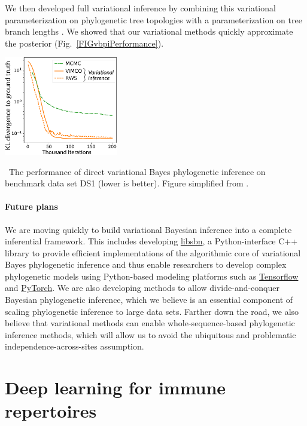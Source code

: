 \documentclass[nobib]{tufte-handout}
\begin{document}
We then developed full variational inference by combining this variational parameterization on phylogenetic tree topologies with a parameterization on tree branch lengths \cite{Zhang2018-lw}.
We showed that our variational methods quickly approximate the posterior (Fig.~\ref{FIGvbpiPerformance}).

\begin{marginfigure}[0.7in]%
  \includegraphics[width=1.95in]{vbpi-performance}
  \caption{\
    The performance of direct variational Bayes phylogenetic inference on benchmark data set DS1 (lower is better).
    Figure simplified from \cite{Zhang2018-lw}.
    }
  \label{FIGvbpiPerformance}
\end{marginfigure}%

\paragraph{Future plans}
We are moving quickly to build variational Bayesian inference into a complete inferential framework.
This includes developing \href{https://github.com/matsengrp/libsbn/}{libsbn}, a Python-interface C++ library to provide efficient implementations of the algorithmic core of variational Bayes phylogenetic inference and thus enable researchers to develop complex phylogenetic models using Python-based modeling platforms such as \href{https://www.tensorflow.org/}{Tensorflow} and \href{https://pytorch.org/}{PyTorch}.
We are also developing methods to allow divide-and-conquer Bayesian phylogenetic inference, which we believe is an essential component of scaling phylogenetic inference to large data sets.
Farther down the road, we also believe that variational methods can enable whole-sequence-based phylogenetic inference methods, which will allow us to avoid the ubiquitous and problematic independence-across-sites assumption.


\vspace{0.3cm}
\section{Deep learning for immune repertoires}
\vspace{-0.3cm}
\end{document}
